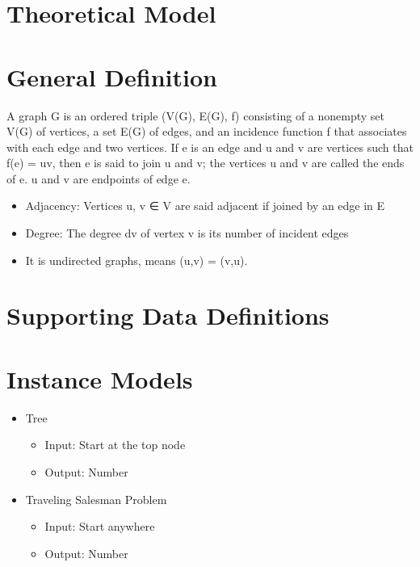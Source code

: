 \documentclass[12pt]{article}
\begin{document}
\section{Theoretical Model}
\section{General Definition}
A graph G is an ordered triple (V(G), E(G), f) consisting of a nonempty set V(G) of vertices, a set E(G) of edges, 
and an incidence function f that associates with each edge and two vertices. If e is an edge and u and v are vertices
such that f(e) = uv, then e is said to join u and v; the vertices u and v are called the ends of e. u and v are endpoints 
of edge e.
\begin{itemize}
    \item Adjacency: Vertices u, v ∈ V are said adjacent if joined by an edge in E
    \item Degree: The degree dv of vertex v is its number of incident edges
    \item It is undirected graphs, means (u,v) = (v,u).
\end{itemize}
\section{Supporting Data Definitions}

\section{Instance Models}
\begin{itemize}
    \item Tree
    \begin{itemize}
        \item Input: Start at the top node
        \item Output: Number
    \end{itemize}
    \item Traveling Salesman Problem
    \begin{itemize}
        \item Input: Start anywhere
        \item Output: Number
    \end{itemize}
\end{itemize}
\end{document}
